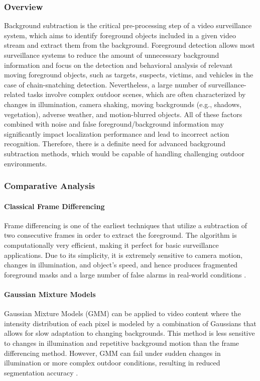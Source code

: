 \documentclass[conference]{IEEEtran}
\begin{document}
\subsubsection{Overview}
Background subtraction is the critical pre-processing step of a video surveillance system, which aims to identify foreground objects included in a given video stream and extract them from the background. Foreground detection allows most surveillance systems to reduce the amount of unnecessary background information and focus on the detection and behavioral analysis of relevant moving foreground objects, such as targets, suspects, victims, and vehicles in the case of chain-snatching detection. Nevertheless, a large number of surveillance-related tasks involve complex outdoor scenes, which are often characterized by changes in illumination, camera shaking, moving backgrounds (e.g., shadows, vegetation), adverse weather, and motion-blurred objects. All of these factors combined with noise and false foreground/background information may significantly impact localization performance and lead to incorrect action recognition. Therefore, there is a definite need for advanced background subtraction methods, which would be capable of handling challenging outdoor environments.

\subsubsection{Comparative Analysis}
\paragraph{Classical Frame Differencing}

Frame differencing is one of the earliest techniques that utilize a subtraction of two consecutive frames in order to extract the foreground. The algorithm is computationally very efficient, making it perfect for basic surveillance applications. Due to its simplicity, it is extremely sensitive to camera motion, changes in illumination, and object’s speed, and hence produces fragmented foreground masks and a large number of false alarms in real-world conditions \cite{framediff}.

\paragraph{Gaussian Mixture Models}

Gaussian Mixture Models (GMM) can be applied to video content where the intensity distribution of each pixel is modeled by a combination of Gaussians that allows for slow adaptation to changing backgrounds. This method is less sensitive to changes in illumination and repetitive background motion than the frame differencing method. However, GMM can fail under sudden changes in illumination or more complex outdoor conditions, resulting in reduced segmentation accuracy \cite{gmm}.
\end{document}
